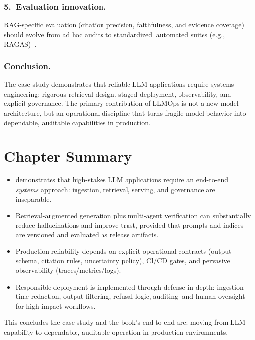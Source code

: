 \subsubsection{5.\ Evaluation innovation.}
RAG-specific evaluation (citation precision, faithfulness, and evidence coverage) should evolve from ad hoc audits to standardized, automated suites (e.g., RAGAS)~\cite{ragas_eacl2024}.

\subsubsection{Conclusion.}
The \ishtar{} case study demonstrates that reliable LLM applications require systems engineering: rigorous retrieval design, staged deployment, observability, and explicit governance.
The primary contribution of LLMOps is not a new model architecture, but an operational discipline that turns fragile model behavior into dependable, auditable capabilities in production.

\section*{Chapter Summary}
\label{sec:ishtar-summary}

\begin{itemize}
    \item \ishtar{} demonstrates that high-stakes LLM applications require an end-to-end \emph{systems} approach: ingestion, retrieval, serving, and governance are inseparable.
    \item Retrieval-augmented generation plus multi-agent verification can substantially reduce hallucinations and improve trust, provided that prompts and indices are versioned and evaluated as release artifacts.
    \item Production reliability depends on explicit operational contracts (output schema, citation rules, uncertainty policy), CI/CD gates, and pervasive observability (traces/metrics/logs).
    \item Responsible deployment is implemented through defense-in-depth: ingestion-time redaction, output filtering, refusal logic, auditing, and human oversight for high-impact workflows.
\end{itemize}

This concludes the \ishtar{} case study and the book's end-to-end arc: moving from LLM capability to dependable, auditable operation in production environments.

\printbibliography[
  heading=subbibliography,
  segment=\therefsegment,
  resetnumbers=true
]
